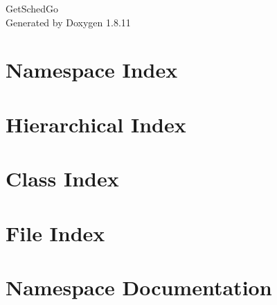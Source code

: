 \documentclass[twoside]{book}
\newcommand{\+}{\discretionary{\mbox{\scriptsize$\hookleftarrow$}}{}{}}
\newcommand{\clearemptydoublepage}{%
  \newpage{\pagestyle{empty}\cleardoublepage}%
}
\begin{document}
\hypersetup{pageanchor=false,
             bookmarksnumbered=true,
             pdfencoding=unicode
            }
\begin{titlepage}
\vspace*{7cm}
\begin{center}%
{\Large Get\+Sched\+Go }\\
\vspace*{1cm}
{\large Generated by Doxygen 1.8.11}\\
\end{center}
\end{titlepage}
\clearemptydoublepage
\tableofcontents
\clearemptydoublepage
{}
\hypersetup{pageanchor=true}

\chapter{Namespace Index}

\chapter{Hierarchical Index}

\chapter{Class Index}

\chapter{File Index}

\chapter{Namespace Documentation}











































\end{document}
